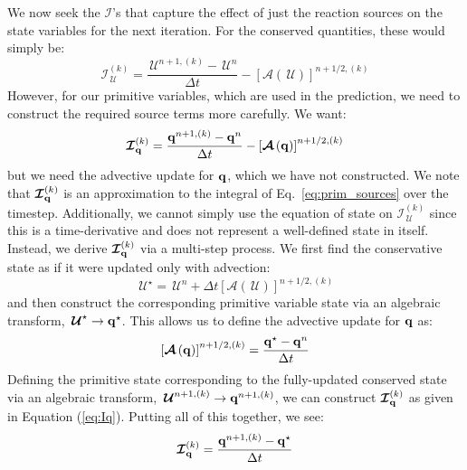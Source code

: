 \documentclass[times,modern]{aastex63}
\newcommand{\Ic}{{\boldsymbol{\mathcal{I}}}}
\newcommand{\Uc}{{\,\bm{\mathcal{U}}}}
\newcommand{\qb}{{\bf q}}
\newcommand{\Adv}[1]{{\left [\boldsymbol{\mathcal{A}} \left(#1\right)\right]}}
\begin{document}
\begin{itemize}
\begin{itemize}
    We now seek the $\Ic$'s that capture the effect of just the
    reaction sources on the state variables for the next iteration.
    For the conserved quantities, these would simply be:
    \begin{equation}
      \Ic^{(k)}_{\Uc} = \frac{\Uc^{n+1,(k)} - \Uc^n}{\Delta t} - \Adv{\Uc}^{n+1/2,(k)}
    \end{equation}
    However, for our primitive variables, which are used in the
    prediction, we need to construct the required source terms more
    carefully.  We want:
    \begin{equation}
      \label{eq:Iq}
      \Ic^{(k)}_{\qb} = \frac{\qb^{n+1,(k)} - \qb^n}{\Delta t} - \Adv{\qb}^{n+1/2,(k)}
    \end{equation}
    but we need the advective update for $\qb$, which we have not
    constructed.  We note that $\Ic^{(k)}_\qb$ is an approximation to the integral of 
    Eq.~\ref{eq:prim_sources} over the timestep.  Additionally, we cannot simply use the equation of
    state on $\Ic^{(k)}_{\Uc}$ since this is a time-derivative and
    does not represent a well-defined state in itself.  Instead, we
    derive $\Ic^{(k)}_{\qb}$ via a multi-step process.  We first find
    the conservative state as if it were updated only with advection:
    \begin{equation}
      \Uc^\star = \Uc^n + \Delta t \Adv{\Uc}^{n+1/2,(k)}
    \end{equation}
    and then construct the corresponding primitive variable state via an algebraic transform,
    $\Uc^\star \rightarrow \qb^\star$.
    This allows us to define the advective update for $\qb$ as:
    \begin{equation}
      \Adv{\qb}^{n+1/2,(k)} = \frac{\qb^\star - \qb^n}{\Delta t}
    \end{equation}
    Defining the primitive state corresponding to the fully-updated
    conserved state via an algebraic transform, $\Uc^{n+1,(k)}
    \rightarrow \qb^{n+1,(k)}$, we can construct $\Ic^{(k)}_{\qb}$ as given
    in Equation (\ref{eq:Iq}).
    Putting all of this together, we see:
    \begin{equation}
      \Ic^{(k)}_{\qb} = \frac{\qb^{n+1,(k)} - \qb^\star}{\Delta t}
    \end{equation}





  \end{itemize}

\end{itemize}
\end{document}
